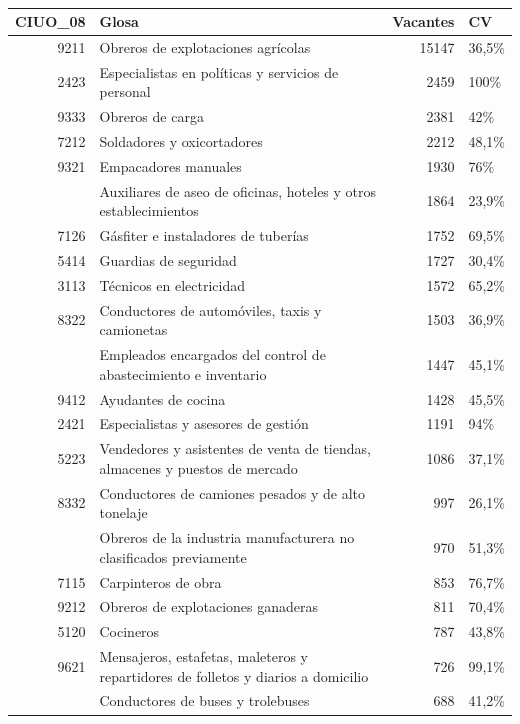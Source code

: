 \documentclass[
  11pt,
]{article}
\begin{document}
\begin{longtable}{r>{\raggedright\arraybackslash}p{9cm}rl}

\caption{\label{tbl-vacantes_totales}}

\tabularnewline

\toprule
CIUO\_08 & Glosa & Vacantes & CV\\
\midrule
9211 & Obreros de explotaciones agrícolas & 15147 & 36,5\%\\
2423 & Especialistas en políticas y servicios de personal & 2459 & 100\%\\
9333 & Obreros de carga & 2381 & 42\%\\
7212 & Soldadores y oxicortadores & 2212 & 48,1\%\\
9321 & Empacadores manuales & 1930 & 76\%\\
\addlinespace
9112 & Auxiliares de aseo de oficinas, hoteles y otros establecimientos & 1864 & 23,9\%\\
7126 & Gásfiter e instaladores de tuberías & 1752 & 69,5\%\\
5414 & Guardias de seguridad & 1727 & 30,4\%\\
3113 & Técnicos en electricidad & 1572 & 65,2\%\\
8322 & Conductores de automóviles, taxis y camionetas & 1503 & 36,9\%\\
\addlinespace
4321 & Empleados encargados del control de abastecimiento e inventario & 1447 & 45,1\%\\
9412 & Ayudantes de cocina & 1428 & 45,5\%\\
2421 & Especialistas y asesores de gestión & 1191 & 94\%\\
5223 & Vendedores y asistentes de venta de tiendas, almacenes y puestos de mercado & 1086 & 37,1\%\\
8332 & Conductores de camiones pesados y de alto tonelaje & 997 & 26,1\%\\
\addlinespace
9329 & Obreros de la industria manufacturera no clasificados previamente & 970 & 51,3\%\\
7115 & Carpinteros de obra & 853 & 76,7\%\\
9212 & Obreros de explotaciones ganaderas & 811 & 70,4\%\\
5120 & Cocineros & 787 & 43,8\%\\
9621 & Mensajeros, estafetas, maleteros y repartidores de folletos y diarios a domicilio & 726 & 99,1\%\\
\addlinespace
8331 & Conductores de buses y trolebuses & 688 & 41,2\%\\

\end{longtable}
\end{document}

